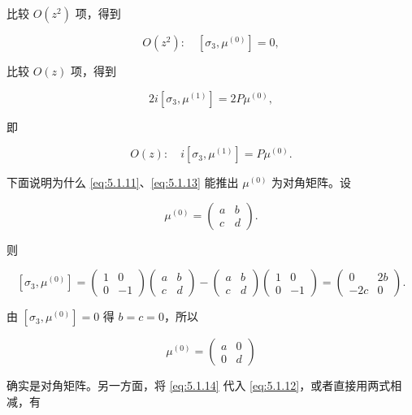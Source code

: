 \documentclass[
    lang=cn,
    scheme=chinese,
    mode=simple,
    device=normal,
    color=blue,
    math=cm,
    thmcnt=section,
    12pt,
    nowatermark
]{elegantbook}
\begin{document}
比较 $O(z^2)$ 项，得到

\begin{equation}
    O(z^2):\quad[\sigma_3,\mu^{(0)}]=0,
    \tag{5.1.13}
    \label{eq:5.1.13}
\end{equation}

比较 $O(z)$ 项，得到

\[
    2i[\sigma_3,\mu^{(1)}]=2P\mu^{(0)},
\]

即

\begin{equation}
    O(z):\quad i[\sigma_3,\mu^{(1)}]=P\mu^{(0)}.
    \tag{5.1.14}
    \label{eq:5.1.14}
\end{equation}

下面说明为什么 \eqref{eq:5.1.11}、\eqref{eq:5.1.13} 能推出 $\mu^{(0)}$ 为对角矩阵。设

\[
    \mu^{(0)}=
    \begin{pmatrix}
        a & b \\
        c & d
    \end{pmatrix}.
\]

则

\[
    [\sigma_3,\mu^{(0)}]
    =
    \begin{pmatrix}
        1 & 0 \\
        0 & -1
    \end{pmatrix}
    \begin{pmatrix}
        a & b \\
        c & d
    \end{pmatrix}
    -
    \begin{pmatrix}
        a & b \\
        c & d
    \end{pmatrix}
    \begin{pmatrix}
        1 & 0 \\
        0 & -1
    \end{pmatrix}
    =
    \begin{pmatrix}
        0  & 2b \\
        -2c & 0
    \end{pmatrix}.
\]

由 $[\sigma_3,\mu^{(0)}]=0$ 得 $b=c=0$，所以

\[
    \mu^{(0)}=
    \begin{pmatrix}
        a & 0 \\
        0 & d
    \end{pmatrix}
\]

确实是对角矩阵。另一方面，将 \eqref{eq:5.1.14} 代入 \eqref{eq:5.1.12}，或者直接用两式相减，有
\end{document}
